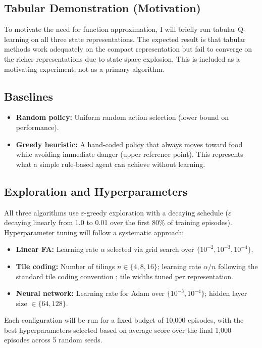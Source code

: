\documentclass[11pt]{article}
\begin{document}
\subsection{Tabular Demonstration (Motivation)}

To motivate the need for function approximation, I will briefly run tabular Q-learning on all three state representations. The expected result is that tabular methods work adequately on the compact representation but fail to converge on the richer representations due to state space explosion. This is included as a motivating experiment, not as a primary algorithm.

\subsection{Baselines}

\begin{itemize}[nosep]
    \item \textbf{Random policy:} Uniform random action selection (lower bound on performance).
    \item \textbf{Greedy heuristic:} A hand-coded policy that always moves toward food while avoiding immediate danger (upper reference point). This represents what a simple rule-based agent can achieve without learning.
\end{itemize}

\subsection{Exploration and Hyperparameters}

All three algorithms use $\varepsilon$-greedy exploration with a decaying schedule ($\varepsilon$ decaying linearly from 1.0 to 0.01 over the first 80\% of training episodes). Hyperparameter tuning will follow a systematic approach:
\begin{itemize}[nosep]
    \item \textbf{Linear FA:} Learning rate $\alpha$ selected via grid search over $\{10^{-2}, 10^{-3}, 10^{-4}\}$.
    \item \textbf{Tile coding:} Number of tilings $n \in \{4, 8, 16\}$; learning rate $\alpha / n$ following the standard tile coding convention \citep{sutton2018reinforcement}; tile widths tuned per representation.
    \item \textbf{Neural network:} Learning rate for Adam over $\{10^{-3}, 10^{-4}\}$; hidden layer size $\in \{64, 128\}$.
\end{itemize}
Each configuration will be run for a fixed budget of 10,000 episodes, with the best hyperparameters selected based on average score over the final 1,000 episodes across 5 random seeds.
\end{document}
